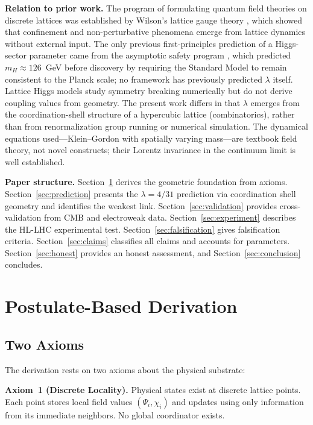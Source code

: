 \documentclass[12pt,a4paper]{article}
\begin{document}
\textbf{Relation to prior work.} The program of formulating quantum field theories on discrete lattices was established by Wilson's lattice gauge theory \citep{Wilson1974}, which showed that confinement and non-perturbative phenomena emerge from lattice dynamics without external input. The only previous first-principles prediction of a Higgs-sector parameter came from the asymptotic safety program \citep{Shaposhnikov2010}, which predicted $m_H \approx 126$~GeV before discovery by requiring the Standard Model to remain consistent to the Planck scale; no framework has previously predicted $\lambda$ itself. Lattice Higgs models \citep{Degrassi2012} study symmetry breaking numerically but do not derive coupling values from geometry. The present work differs in that $\lambda$ emerges from the coordination-shell structure of a hypercubic lattice (combinatorics), rather than from renormalization group running or numerical simulation. The dynamical equations used---Klein--Gordon with spatially varying mass---are textbook field theory, not novel constructs; their Lorentz invariance in the continuum limit is well established.

\textbf{Paper structure.} Section~\ref{sec:derivation} derives the geometric foundation from axioms. Section~\ref{sec:prediction} presents the $\lambda = 4/31$ prediction via coordination shell geometry and identifies the weakest link. Section~\ref{sec:validation} provides cross-validation from CMB and electroweak data. Section~\ref{sec:experiment} describes the HL-LHC experimental test. Section~\ref{sec:falsification} gives falsification criteria. Section~\ref{sec:claims} classifies all claims and accounts for parameters. Section~\ref{sec:honest} provides an honest assessment, and Section~\ref{sec:conclusion} concludes.


\section{Postulate-Based Derivation}\label{sec:derivation}

\subsection{Two Axioms}

The derivation rests on two axioms about the physical substrate:

\textbf{Axiom~1 (Discrete Locality).} Physical states exist at discrete lattice points. Each point stores local field values $(\Psi_i, \chi_i)$ and updates using only information from its immediate neighbors. No global coordinator exists.
\end{document}
